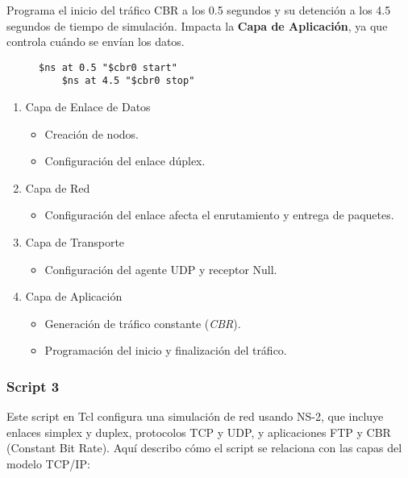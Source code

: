 \noindent Programa el inicio del tr\'afico CBR a los 0.5 segundos y su detenci\'on a los 4.5 segundos de tiempo de simulaci\'on. Impacta la
\textbf{Capa de Aplicaci\'on}, ya que controla cu\'ando se env\'ian los datos.
\begin{figure}[H]
  \begin{lstlisting}[frame=single, breaklines=true, basicstyle=\footnotesize\ttfamily, breakatwhitespace=false, 
    columns=flexible, tabsize=2, showstringspaces=false]
    $ns at 0.5 "$cbr0 start"
    $ns at 4.5 "$cbr0 stop"    
  \end{lstlisting}
\end{figure}

\begin{enumerate}
  \item Capa de Enlace de Datos
  \begin{itemize}
    \item Creaci\'on de nodos.
    \item Configuraci\'on del enlace d\'uplex.
  \end{itemize}

  \item Capa de Red
  \begin{itemize}
    \item Configuraci\'on del enlace afecta el enrutamiento y entrega de paquetes.
  \end{itemize}

  \item Capa de Transporte
  \begin{itemize}
    \item Configuraci\'on del agente UDP y receptor Null.
  \end{itemize}

  \item Capa de Aplicaci\'on
  \begin{itemize}
    \item Generaci\'on de tr\'afico constante (\textit{CBR}).
    \item Programaci\'on del inicio y finalizaci\'on del tr\'afico.
  \end{itemize}
\end{enumerate}

\subsubsection*{Script 3}

Este script en Tcl configura una simulación de red usando NS-2, que incluye enlaces simplex y duplex, protocolos TCP y UDP, y aplicaciones FTP y CBR (Constant Bit Rate). Aquí describo cómo el script se relaciona con las capas del modelo TCP/IP:

